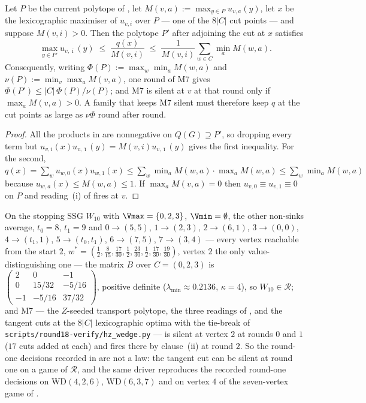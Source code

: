 \begin{corollary}\label{ht:cor-cutwidth}
Let $P$ be the current polytope of , let
$M(v,a):=\max_{y\in P}u_{v,a}(y)$, let $x$ be the lexicographic maximiser of
$u_{v,i}$ over $P$ --- one of the $8|C|$ cut points --- and suppose
$M(v,i)>0$. Then the polytope $P'$ after adjoining the cut at $x$ satisfies
\[
  \max_{y\in P'}u_{v,\bar\imath}(y)\;\le\;\frac{q(x)}{M(v,i)}\;\le\;
  \frac{1}{M(v,i)}\sum_{w\in C}\min_a M(w,a).
\]
Consequently, writing $\Phi(P):=\max_{w}\min_aM(w,a)$ and
$\nu(P):=\min_v\max_aM(v,a)$, one round of \textup{M7} gives
$\Phi(P')\le|C|\,\Phi(P)/\nu(P)$; and \textup{M7} is silent at $v$ at that
round only if $\max_aM(v,a)>0$. A family that keeps \textup{M7} silent must
therefore keep $q$ at the cut points as large as $\nu\Phi$ round after round.
\end{corollary}

\begin{proof}
All the products in  are nonnegative on $Q(G)\supseteq P'$,
so dropping every term but $u_{v,i}(x)u_{v,\bar\imath}(y)=M(v,i)u_{v,\bar\imath}(y)$
gives the first inequality. For the second,
$q(x)=\sum_wu_{w,0}(x)u_{w,1}(x)\le\sum_w\min_aM(w,a)\cdot\max_aM(w,a)\le\sum_w\min_aM(w,a)$
because $u_{w,a}(x)\le M(w,a)\le1$. If $\max_aM(v,a)=0$ then
$u_{v,0}\equiv u_{v,1}\equiv0$ on $P$ and reading~(i) of
 fires at $v$.
\end{proof}

\begin{proposition}\label{ht:prop-tworounds}
On the stopping SSG $W_{10}$ with $\Vmax=\{0,2,3\}$, $\Vmin=\emptyset$, the
other non-sinks average, $t_0=8$, $t_1=9$ and
$0\to(5,5)$, $1\to(2,3)$, $2\to(6,1)$, $3\to(0,0)$, $4\to(t_1,1)$,
$5\to(t_0,t_1)$, $6\to(7,5)$, $7\to(3,4)$ --- every vertex reachable from the
start $2$, $w^\ast=(\tfrac12,\tfrac8{15},\tfrac{17}{30},\tfrac12,
\tfrac{23}{30},\tfrac12,\tfrac{17}{30},\tfrac{19}{30})$, vertex $2$ the only
value-distinguishing one --- the matrix $B$ over $C=(0,2,3)$ is
$\left(\begin{smallmatrix}2&0&-1\\0&15/32&-5/16\\-1&-5/16&37/32\end{smallmatrix}\right)$,
positive definite ($\lambda_{\min}\approx0.2136$, $\kappa=4$), so
$W_{10}\in\mathcal R$; and \textup{M7} --- the $Z$-seeded transport polytope,
the three readings of , and the tangent cuts at the
$8|C|$ lexicographic optima with the tie-break of
\texttt{scripts/round18-verify/hz\_wedge.py} --- is silent at vertex $2$ at
rounds $0$ and $1$ ($17$ cuts added at each) and fires there by clause~(ii) at
round $2$. So the round-one decisions recorded in  are
not a law: the tangent cut can be silent at round one on a game of
$\mathcal R$, and the same driver reproduces the recorded round-one decisions
on $\mathrm{WD}(4,2,6)$, $\mathrm{WD}(6,3,7)$ and on vertex $4$ of the
seven-vertex game of .
\end{proposition}